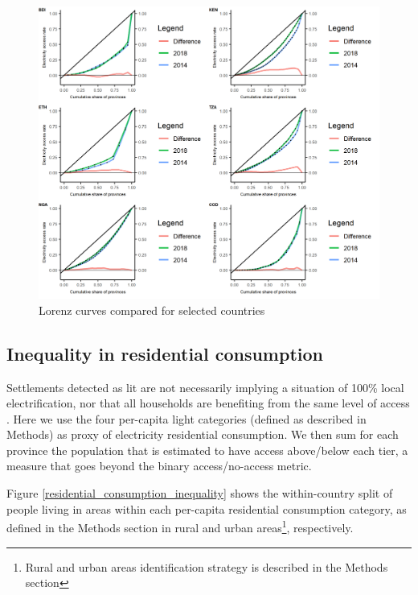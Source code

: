 \documentclass[preprint,12pt]{elsarticle}
\begin{document}
\begin{figure}[H]
    \centering
    \includegraphics[scale=1]{figures/Lorenz.png} 
    \caption{Lorenz curves compared for selected countries}
    \label{lorenz}
\end{figure}

\subsection{Inequality in residential consumption}
Settlements detected as lit are not necessarily implying a situation of 100\% local electrification, nor that all households are benefiting from the same level of access \citep{riva_merry-go-round_2018}. Here we use the four per-capita light categories (defined as described in Methods) as proxy of electricity residential consumption. We then sum for each province the population that is estimated to have access above/below each tier, a measure that goes beyond the binary access/no-access metric.

Figure \ref{residential_consumption_inequality} shows the within-country split of people living in areas within each per-capita residential consumption category, as defined in the Methods section in rural and urban areas\footnote{Rural and urban areas identification strategy is described in the Methods section}, respectively.
\end{document}
